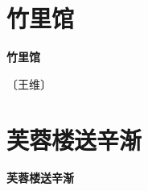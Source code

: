 \documentclass[12pt,UTF-8,openany,fontset=none]{ctexbook}
\begin{document}
\vspace{8pt}
\clearpage


\section{竹里馆}



\begin{center}
    {\bfseries 竹里馆}
\end{center}

\begin{center}
    \vspace{10pt}
    
    \begin{large}
        
        〔王维〕
        
    \end{large}
    
    \vspace{8pt}
    
    \begin{huge}
        
        \phantom{。}

        \phantom{。}
        
        \phantom{。}

        \phantom{。}
        
    \end{huge}
    
\end{center}

\vspace{8pt}
\clearpage


\section{芙蓉楼送辛渐}



\begin{center}
    {\bfseries 芙蓉楼送辛渐}
\end{center}
\end{document}
